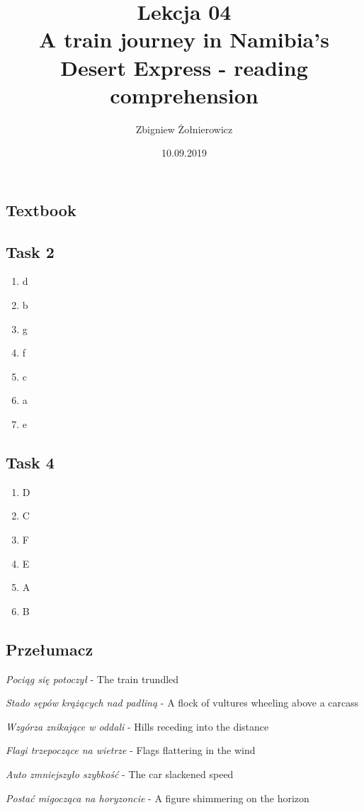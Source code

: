 \documentclass[a4paper]{article}
\begin{document}
\title{{\huge Lekcja 04} \\
{\large A train journey in Namibia's Desert Express - reading comprehension}}
\author{Zbigniew Żołnierowicz}
\date{10.09.2019}
\maketitle
\subsection*{Textbook}
\subsection{Task 2}
\begin{enumerate}
    \item d
    \item b
    \item g
    \item f
    \item c
    \item a
    \item e
\end{enumerate}
\subsection{Task 4}
\begin{enumerate}
    \item D
    \item C
    \item F
    \item E
    \item A
    \item B
\end{enumerate}
\subsection{Przełumacz}
\emph{Pociąg się potoczył} - The train trundled

\emph{Stado sępów krążących nad padliną} - A flock of vultures wheeling above a carcass

\emph{Wzgórza znikające w oddali} - Hills receding into the distance

\emph{Flagi trzepoczące na wietrze} - Flags flattering in the wind

\emph{Auto zmniejszyło szybkość} - The car slackened speed

\emph{Postać migocząca na horyzoncie} - A figure shimmering on the horizon
\end{document}

